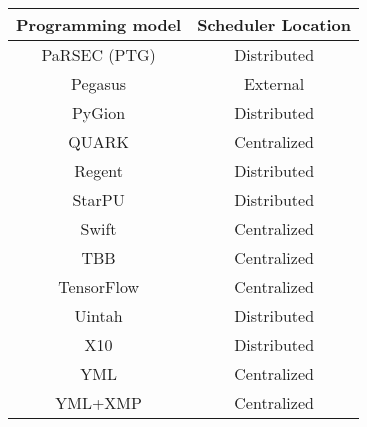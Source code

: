 \begin{tabular}{cc}
\hline
Programming model & Scheduler Location \\
\hline
PaRSEC (PTG) & Distributed\\
Pegasus & External\\
PyGion & Distributed\\
QUARK & Centralized\\
Regent & Distributed\\
StarPU & Distributed\\
Swift & Centralized\\
TBB & Centralized\\
TensorFlow & Centralized\\
Uintah & Distributed\\
X10 & Distributed\\
YML & Centralized\\
YML+XMP & Centralized\\
\hline
\end{tabular}
